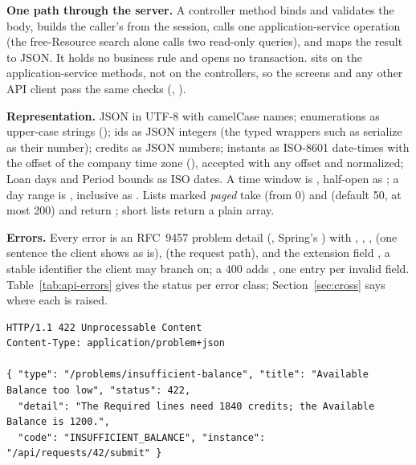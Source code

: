 \textbf{One path through the server.} A controller method binds and validates the body, builds the caller's  from the session, calls one application-service operation (the free-Resource search alone calls two read-only queries), and maps the result to JSON. It holds no business rule and opens no transaction.  sits on the application-service methods, not on the controllers, so the screens and any other API client pass the same checks (, ).

\textbf{Representation.} JSON in UTF-8 with camelCase names; enumerations as upper-case strings (); ids as JSON integers (the typed wrappers such as  serialize as their number); credits as JSON numbers; instants as ISO-8601 date-times with the offset of the company time zone (), accepted with any offset and normalized; Loan days and Period bounds as ISO dates. A time window is , half-open as ; a day range is , inclusive as . Lists marked \emph{paged} take  (from 0) and  (default 50, at most 200) and return ; short lists return a plain array.

\textbf{Errors.} Every error is an RFC~9457 problem detail (, Spring's ) with , , ,  (one sentence the client shows as is),  (the request path), and the extension field , a stable identifier the client may branch on; a 400 adds , one entry per invalid field. Table~\ref{tab:api-errors} gives the status per error class; Section~\ref{sec:cross} says where each is raised.

\begin{lstlisting}
HTTP/1.1 422 Unprocessable Content
Content-Type: application/problem+json

{ "type": "/problems/insufficient-balance", "title": "Available Balance too low", "status": 422,
  "detail": "The Required lines need 1840 credits; the Available Balance is 1200.",
  "code": "INSUFFICIENT_BALANCE", "instance": "/api/requests/42/submit" }
\end{lstlisting}

